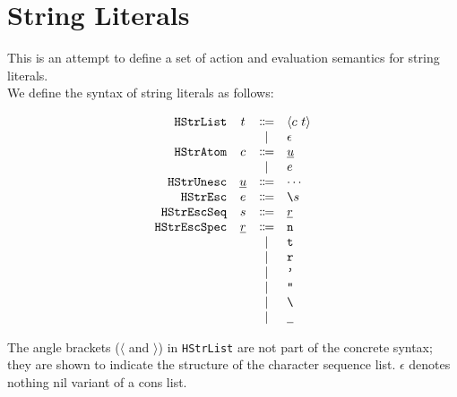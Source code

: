 \documentclass[12pt]{article}
\begin{document}
\section{String Literals}
This is an attempt to define a set of action and evaluation semantics for string literals. \\

\noindent We define the syntax of string literals as follows:
%
\begin{center}
  \vspace*{-1.5em}
  \[\begin{array}{rccl}
    \texttt{HStrList}    & t    & \Coloneqq & \langle c~t \rangle \\
                &                 & \mid         & \epsilon                            \\
    \texttt{HStrAtom}    & c    & \Coloneqq & \underline{u}                         \\
                &                 & \mid         & e                           \\
    \texttt{HStrUnesc}   & \underline{u}   & \Coloneqq & \cdots                                     \\
    \texttt{HStrEsc}     & e     & \Coloneqq & \texttt{\textbackslash}s              \\
    \texttt{HStrEscSeq}  & s  & \Coloneqq & \underline{r}                       \\
    \texttt{HStrEscSpec} & \underline{r} & \Coloneqq & \texttt{n}                                     \\
                &                 & \mid         & \texttt{t}                                     \\
                &                 & \mid         & \texttt{r}                                     \\
                &                 & \mid         & \texttt{'}                                     \\
                &                 & \mid         & \texttt{"}                                     \\
                &                 & \mid         & \texttt{\textbackslash}                        \\
                &                 & \mid         & \texttt{\underline{\ }}                        \\
  \end{array}\]
\end{center}
%
The angle brackets ($\langle$ and $\rangle$) in \texttt{HStrList} are not part of the concrete
syntax; they are shown to indicate the structure of the character sequence list. $\epsilon$ denotes
nothing nil variant of a cons list.
\end{document}
